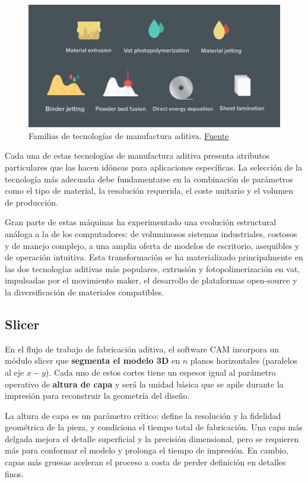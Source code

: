 \begin{figure}[h!]
	\centering
	\includegraphics[width=0.9\linewidth]{imgs/3tec.png}
	\caption{Familias de tecnologías de manufactura aditiva. \href{https://www.voxelmatters.com/3d-hubs-publishes-complete-3d-printing-technologies-infographic/}{Fuente}}
	\label{3ptecs}
\end{figure}

Cada una de estas tecnologías de manufactura aditiva presenta atributos particulares que las hacen idóneas para aplicaciones específicas. La selección de la tecnología más adecuada debe fundamentarse en la combinación de parámetros como el tipo de material, la resolución requerida, el coste unitario y el volumen de producción.  

Gran parte de estas máquinas ha experimentado una evolución estructural análoga a la de los computadores: de voluminosos sistemas industriales, costosos y de manejo complejo, a una amplia oferta de modelos de escritorio, asequibles y de operación intuitiva. Esta transformación se ha materializado principalmente en las dos tecnologías aditivas más populares, extrusión y fotopolimerización en vat, impulsadas por el movimiento maker, el desarrollo de plataformas open-source y la diversificación de materiales compatibles.

\subsection{Slicer}

En el flujo de trabajo de fabricación aditiva, el software CAM incorpora un módulo slicer que \textbf{segmenta el modelo 3D} en $n$ planos horizontales (paralelos al eje $x-y$). Cada uno de estos cortes tiene un espesor igual al parámetro operativo de \textbf{altura de capa} y será la unidad básica que se apile durante la impresión para reconstruir la geometría del diseño.

La altura de capa es un parámetro crítico: define la resolución y la fidelidad geométrica de la pieza, y condiciona el tiempo total de fabricación. Una capa más delgada mejora el detalle superficial y la precisión dimensional, pero se requieren más para conformar el modelo y prolonga el tiempo de impresión. En cambio, capas más gruesas aceleran el proceso a costa de perder definición en detalles finos.

